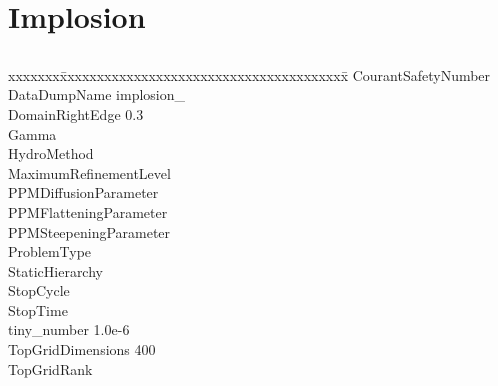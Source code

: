 \documentclass{book}
\begin{document}
\subsection{\cello}

\section{Implosion} \label{s:Implosion}

\subsection{\enzo}

{\parametersize
\begin{tabbing}
xxxxxxx\=xxxxxxxxxxxxxxxxxxxxxxxxxxxxxxxxxxxxxxx\=\kill
\> CourantSafetyNumber             \\
\> DataDumpName              \> implosion\_ \\
\> DomainRightEdge            0.3 \\
\> Gamma                      \\
\> HydroMethod                       \\
\> MaximumRefinementLevel            \\
\> PPMDiffusionParameter      \\
\> PPMFlatteningParameter     \\
\> PPMSteepeningParameter     \\
\> ProblemType                       \\
\> StaticHierarchy                   \\
\> StopCycle                  \\
\> StopTime                   \\
\> tiny\_number               \> 1.0e-6   \\
\> TopGridDimensions          400 \\
\> TopGridRank               
\end{tabbing}}

\end{document}
